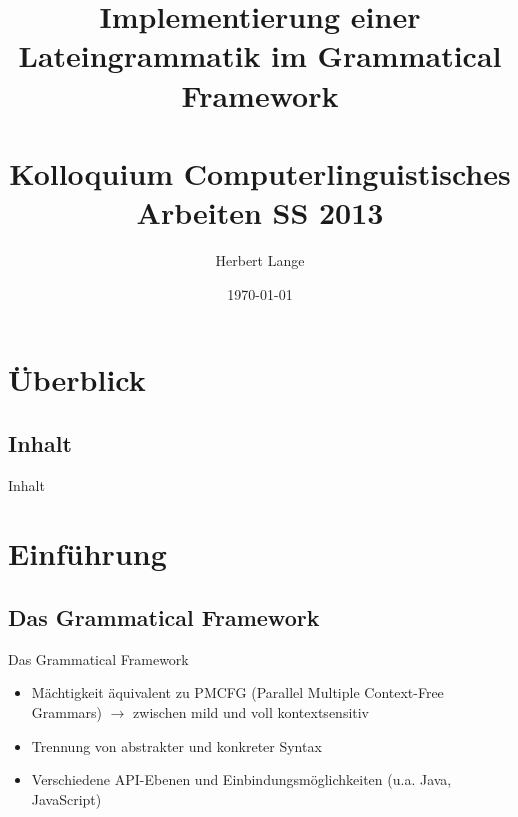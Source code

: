 \documentclass{beamer}
\title[Implementierung einer Lateingrammatik]{Implementierung einer Lateingrammatik im Grammatical Framework \\ \quad \\ \large Kolloquium Computerlinguistisches Arbeiten SS 2013 }
\author{Herbert Lange}
\date{\today}
\begin{document}
\frame{\titlepage}

\section*{Überblick}
\subsection*{Inhalt}
\begin{frame}{Inhalt}
\tableofcontents
\end{frame}
\section{Einführung}
\subsection{Das Grammatical Framework}
\begin{frame}[fragile]{Das Grammatical Framework}
\begin{itemize}
\item Mächtigkeit äquivalent zu PMCFG (Parallel Multiple Context-Free Grammars)
$\rightarrow$ zwischen mild und voll kontextsensitiv
\item Trennung von abstrakter und konkreter Syntax
\item Verschiedene API-Ebenen und Einbindungsmöglichkeiten (u.a. Java, JavaScript)
\end{itemize}
\end{frame}
\end{document}

